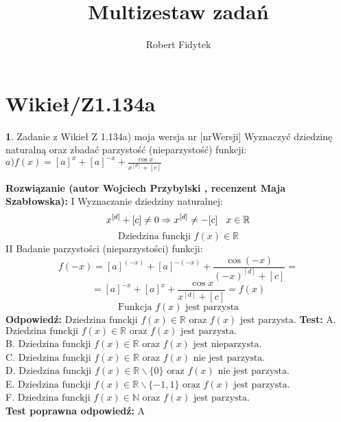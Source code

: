 \documentclass[12pt, a4paper]{article}
\title{Multizestaw zadań}
\author{Robert Fidytek}
\date{}
\theoremstyle{definition} %
\newtheorem{zad}{}
\newcommand{\kategoria}[1]{\section{#1}} %
\newcommand{\zadStart}[1]{\begin{zad}#1\newline} %
\newcommand{\zadStop}{\end{zad}}   %
\newcommand{\rozwStart}[2]{\noindent \textbf{Rozwiązanie (autor #1 , recenzent #2): }\newline} %
\newcommand{\rozwStop}{\newline}                                            %
\newcommand{\odpStart}{\noindent \textbf{Odpowiedź:}\newline}    %
\newcommand{\odpStop}{\newline}                                             %
\newcommand{\testStart}{\noindent \textbf{Test:}\newline} %
\newcommand{\testStop}{\newline} %
\newcommand{\kluczStart}{\noindent \textbf{Test poprawna odpowiedź:}\newline} %
\newcommand{\kluczStop}{\newline} %
\begin{document}
\maketitle


\kategoria{Wikieł/Z1.134a}
\zadStart{Zadanie z Wikieł Z 1.134a) moja wersja nr [nrWersji]}
Wyznaczyć dziedzinę naturalną oraz zbadać parzystość (nieparzystość) funkcji:\\
$a)f(x)=[a]^{x}+[a]^{-x}+\frac{\cos x}{x^{[d]}+[c]}$
\zadStop
\rozwStart{Wojciech Przybylski}{Maja Szabłowska}
I Wyznaczanie dziedziny naturalnej:\\
$$x^{[d]}+[c]\neq0 \Rightarrow x^{[d]}\neq-[c]\hspace{3mm}x\in\mathbb{R} $$
$$\mbox{Dziedzina funckji }f(x)\in \mathbb{R}$$
II Badanie parzystości (nieparzystości) funkcji:
$$f(-x)=[a]^{(-x)}+[a]^{-(-x)}+\frac{\cos (-x)}{(-x)^{[d]}+[c]}=$$
$$=[a]^{-x}+[a]^{x}+\frac{\cos x}{x^{[d]}+[c]}=f(x)$$
$$\mbox{Funkcja }f(x)\mbox{ jest parzysta}$$
\rozwStop
\odpStart
$\mbox{Dziedzina funckji }f(x)\in \mathbb{R} \mbox{ oraz } f(x)\mbox{ jest parzysta.}$ 
\odpStop
\testStart
A. $\mbox{Dziedzina funckji }f(x)\in \mathbb{R} \mbox{ oraz } f(x)\mbox{ jest parzysta.}$ \\
B. $\mbox{Dziedzina funckji }f(x)\in \mathbb{R} \mbox{ oraz } f(x)\mbox{ jest nieparzysta.}$ \\
C. $\mbox{Dziedzina funckji }f(x)\in \mathbb{R} \mbox{ oraz } f(x)\mbox{ nie jest parzysta.}$ \\
D. $\mbox{Dziedzina funckji }f(x)\in \mathbb{R}\backslash\{0\} \mbox{ oraz } f(x)\mbox{ nie jest parzysta.}$ \\
E. $\mbox{Dziedzina funckji }f(x)\in \mathbb{R}{\backslash}\{-1,1\} \mbox{ oraz } f(x)\mbox{ jest parzysta.}$ \\
F. $\mbox{Dziedzina funckji }f(x)\in \mathbb{N} \mbox{ oraz } f(x)\mbox{ jest parzysta.}$ \\
\testStop
\kluczStart
A
\kluczStop
\end{document}
